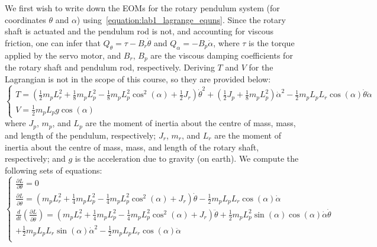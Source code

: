 We first wish to write down the EOMs for the rotary pendulum system (for coordinates \( \theta \) and \( \alpha \)) using~\eqref{equation:lab1_lagrange_equns}. Since the rotary shaft is actuated and the pendulum rod is not, and accounting for viscous friction, one can infer that $Q_\theta = \tau - B_r \dot{\theta} $ and $Q_\alpha = -B_p \dot{\alpha}$, where $\tau$ is the torque applied by the servo motor, and $B_r$, $B_p$ are the viscous damping coefficients for the rotary shaft and pendulum rod, respectively. Deriving $T$ and $V$ for the Lagrangian is not in the scope of this course, so they are provided below:
\begin{equation*}
    \begin{cases}
        T = \left(\frac{1}{2} m_p L_{r}^2 + \frac{1}{8} m_p L_{p}^2 - \frac{1}{8} m_p L_{p}^2 \cos^2(\alpha) + \frac{1}{2} J_r\right) \dot{\theta}^2 + \left(\frac{1}{2} J_p + \frac{1}{8} m_p L_{p}^2 \right) \dot{\alpha}^2 - \frac{1}{2} m_p L_p L_r \cos(\alpha) \dot{\theta} \dot{\alpha} \\
        V = \frac{1}{2} m_p L_p g \cos(\alpha)
    \end{cases}
\end{equation*}
where $J_p$, $m_p$, and $L_p$ are the moment of inertia about the centre of mass, mass, and length of the pendulum, respectively; $J_r$, $m_r$, and $L_r$ are the moment of inertia about the centre of mass, mass, and length of the rotary shaft, respectively; and $g$ is the acceleration due to gravity (on earth).
We compute the following sets of equations:
\[
    \begin{cases}
        \frac{\partial{L}}{\partial \theta}=0                                                                                                                                                      \\
        \frac{\partial L}{\partial \dot{\theta}}=\left( m_pL_r^2 +\frac{1}{4} m_p L_p^2-\frac{1}{4}m_pL_p^2\cos^2(\alpha)+J_r\right)\dot{\theta} - \frac{1}{2} m_pL_pL_r\cos{(\alpha)}\dot{\alpha} \\
        \frac{d}{dt} \left(\frac{\partial L}{\partial \dot{\theta}}\right)= \left(m_pL_r^2 +\frac{1}{4}m_pL_p^2-\frac{1}
        {4}m_pL_p^2\cos^2(\alpha)+J_r\right)\ddot{\theta} + \frac{1}{2}m_pL_p^2\sin{(\alpha)}\cos{(\alpha)} \dot{\alpha}\dot{\theta}                                                               \\+ \frac{1}{2}m_pL_pL_r\sin{(\alpha)}\dot{\alpha}^2-\frac{1}{2}m_pL_pL_r\cos{(\alpha)}\ddot{\alpha} \\
    \end{cases}
\]
